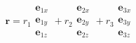 \documentclass[preview]{standalone}
\begin{document}
\begin{align*}
\textbf{r} = r_1 \begin{matrix}\textbf{e}_{1x}\\\textbf{e}_{1y}\\\textbf{e}_{1z}\end{matrix} + r_2 \begin{matrix}\textbf{e}_{2x}\\\textbf{e}_{2y}\\\textbf{e}_{2z}\end{matrix} + r_3 \begin{matrix}\textbf{e}_{3x}\\\textbf{e}_{3y}\\\textbf{e}_{3z}\end{matrix}
\end{align*}
\end{document}
